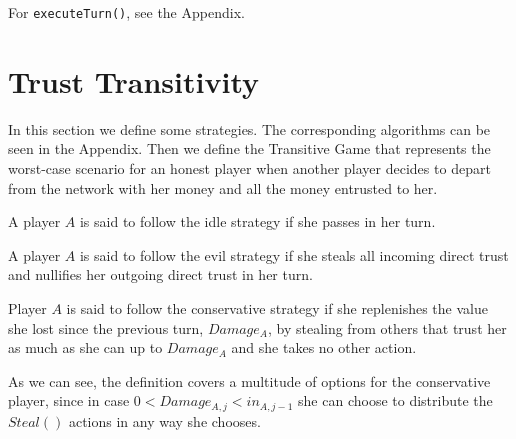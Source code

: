 \documentclass[11pt]{llncs}
\makeatletter
\newcommand*\Suppressnumber{%
  \lst@AddToHook{OnNewLine}{%
    \let\thelstnumber\relax%
     \advance\c@lstnumber-\@ne\relax%
    }%
}
\theoremstyle{definition}
\makeatother
\begin{document}
    For \texttt{executeTurn()}, see the Appendix.
  \section{Trust Transitivity}
     In this section we define some strategies. The corresponding algorithms can be seen in the Appendix. Then we define the
     Transitive Game that represents the worst-case scenario for an honest player when another player decides to depart from
     the network with her money and all the money entrusted to her.
     \begin{definition}
        A player $A$ is said to follow the idle strategy if she passes in her turn. 
     \end{definition}
     \begin{definition}
        A player $A$ is said to follow the evil strategy if she steals all incoming direct trust and nullifies her outgoing
        direct trust in her turn.
     \end{definition}
     \begin{definition}
        Player $A$ is said to follow the conservative strategy if she replenishes the value she lost since the previous turn,
        $Damage_A$, by stealing from others that trust her as much as she can up to $Damage_A$ and she takes no other action.
     \end{definition}
     As we can see, the definition covers a multitude of options for the conservative player, since in case $0 < Damage_{A,j}
     < in_{A,j-1}$ she can choose to distribute the $Steal\left(\right)$ actions in any way she chooses.
\end{document}
